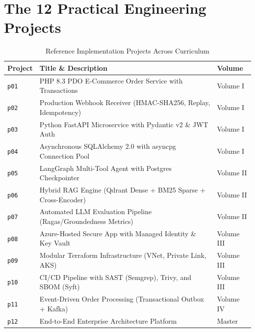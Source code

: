 \documentclass[11pt,oneside]{book}
\begin{document}
\section*{The 12 Practical Engineering Projects}
\begin{table}[htbp]
\centering\small
\begin{tabular}{lp{6.5cm}l}
\toprule
\textbf{Project} & \textbf{Title \& Description} & \textbf{Volume} \\
\midrule
\texttt{p01} & PHP 8.3 PDO E-Commerce Order Service with Transactions & Volume I \\
\texttt{p02} & Production Webhook Receiver (HMAC-SHA256, Replay, Idempotency) & Volume I \\
\texttt{p03} & Python FastAPI Microservice with Pydantic v2 \& JWT Auth & Volume I \\
\texttt{p04} & Asynchronous SQLAlchemy 2.0 with asyncpg Connection Pool & Volume I \\
\texttt{p05} & LangGraph Multi-Tool Agent with Postgres Checkpointer & Volume II \\
\texttt{p06} & Hybrid RAG Engine (Qdrant Dense + BM25 Sparse + Cross-Encoder) & Volume II \\
\texttt{p07} & Automated LLM Evaluation Pipeline (Ragas/Groundedness Metrics) & Volume II \\
\texttt{p08} & Azure-Hosted Secure App with Managed Identity \& Key Vault & Volume III \\
\texttt{p09} & Modular Terraform Infrastructure (VNet, Private Link, AKS) & Volume III \\
\texttt{p10} & CI/CD Pipeline with SAST (Semgrep), Trivy, and SBOM (Syft) & Volume III \\
\texttt{p11} & Event-Driven Order Processing (Transactional Outbox + Kafka) & Volume IV \\
\texttt{p12} & End-to-End Enterprise Architecture Platform & Master \\
\bottomrule
\end{tabular}
\caption{Reference Implementation Projects Across Curriculum}
\end{table}
\end{document}
